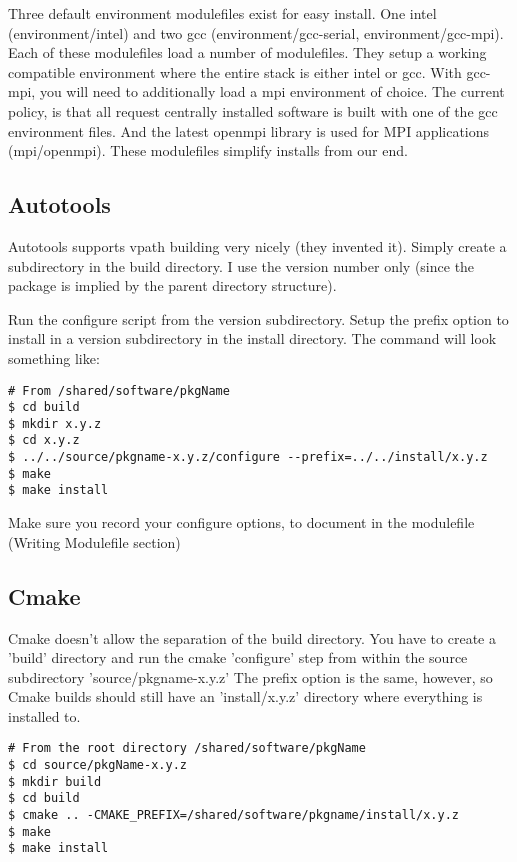 \documentclass{article}
\begin{document}
Three default environment modulefiles exist for easy install.  One intel 
(environment/intel) and two gcc (environment/gcc-serial, environment/gcc-mpi).  
Each of these modulefiles load a number of modulefiles.  They setup a working 
compatible environment where the entire stack is either intel or gcc.  With 
gcc-mpi, you will need to additionally load a mpi environment of choice.  The 
current policy, is that all request centrally installed software is built with 
one of the gcc environment files.  And the latest openmpi library is used for 
MPI applications (mpi/openmpi).  These modulefiles simplify installs from our 
end.

\subsection{Autotools}

Autotools supports vpath building very nicely (they invented it).  Simply 
create a subdirectory in the build directory.  I use the version number only 
(since the package is implied by the parent directory structure).

Run the configure script from the version subdirectory.  Setup the prefix 
option to install in a version subdirectory in the install directory.  The 
command will look something like:

\begin{verbatim}
# From /shared/software/pkgName
$ cd build
$ mkdir x.y.z
$ cd x.y.z
$ ../../source/pkgname-x.y.z/configure --prefix=../../install/x.y.z
$ make
$ make install
\end{verbatim}

Make sure you record your configure options, to document in the modulefile 
(Writing Modulefile section)

\subsection{Cmake}

Cmake doesn't allow the separation of the build directory.  You have to create 
a 'build' directory and run the cmake 'configure' step from within the source 
subdirectory 'source/pkgname-x.y.z'   The prefix option is the same, however, 
so Cmake builds should still have an 'install/x.y.z' directory where everything 
is installed to.

\begin{verbatim}
# From the root directory /shared/software/pkgName
$ cd source/pkgName-x.y.z
$ mkdir build
$ cd build
$ cmake .. -CMAKE_PREFIX=/shared/software/pkgname/install/x.y.z
$ make
$ make install
\end{verbatim}
\end{document}
